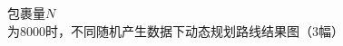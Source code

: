 \documentclass[10.5pt,twocolumn]{jbuaa}
\begin{document}
\begin{figure}[!h]
{\begin{minipage}{5cm}
		\end{minipage}}
		\caption{包裹量$N$为8000时，不同随机产生数据下动态规划路线结果图（3幅）} 
		\label{fig:4}                                          %

	\end{figure}
\end{document}
